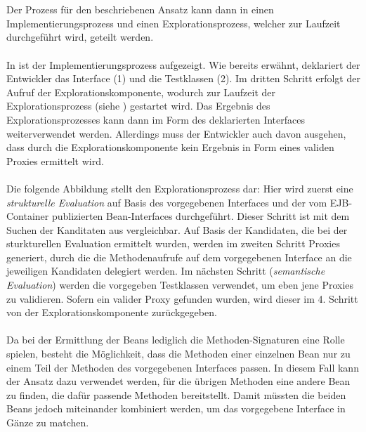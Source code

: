 \\\\
Der Prozess für den beschriebenen Ansatz kann dann in einen Implementierungsprozess und einen Explorationsprozess, welcher zur Laufzeit durchgeführt wird, geteilt werden.
\\\\
In  ist der Implementierungsprozess aufgezeigt.
\noindent
Wie bereits erwähnt, deklariert der Entwickler das Interface (1) und die Testklassen (2). Im dritten Schritt erfolgt der Aufruf der Explorationskomponente, wodurch zur Laufzeit der Explorationsprozess (siehe ) gestartet wird. Das Ergebnis des Explorationsprozesses kann dann im Form des deklarierten Interfaces weiterverwendet werden. Allerdings muss der Entwickler auch davon ausgehen, dass durch die Explorationskomponente kein Ergebnis in Form eines validen Proxies ermittelt wird.
\\\\
Die folgende Abbildung stellt den Explorationsprozess dar:
\noindent
Hier wird zuerst eine \emph{strukturelle Evaluation} auf Basis des vorgegebenen Interfaces und der vom EJB-Container publizierten Bean-Interfaces durchgeführt. 
Dieser Schritt ist mit dem Suchen der Kanditaten aus  vergleichbar. Auf Basis der Kandidaten, die bei der sturkturellen Evaluation ermittelt wurden, werden im zweiten Schritt Proxies generiert, durch die die Methodenaufrufe auf dem vorgegebenen Interface an die jeweiligen Kandidaten delegiert werden. Im nächsten Schritt (\emph{semantische Evaluation}) werden die vorgegeben Testklassen verwendet, um eben jene Proxies zu validieren. Sofern ein valider Proxy gefunden wurden, wird dieser im 4. Schritt von der Explorationskomponente zurückgegeben.
\\\\
Da bei der Ermittlung der Beans lediglich die Methoden-Signaturen eine Rolle spielen, besteht die Möglichkeit, dass die Methoden einer einzelnen Bean nur zu einem Teil der Methoden des vorgegebenen Interfaces passen. In diesem Fall kann der Ansatz dazu verwendet werden, für die übrigen Methoden eine andere Bean zu finden, die dafür passende Methoden bereitstellt. Damit müssten die beiden Beans jedoch miteinander kombiniert werden, um das vorgegebene Interface in Gänze zu matchen.
\\\\
